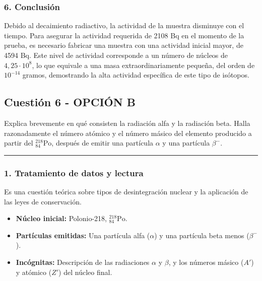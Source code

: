 \subsubsection*{6. Conclusión}
\begin{cajaconclusion}
Debido al decaimiento radiactivo, la actividad de la muestra disminuye con el tiempo. Para asegurar la actividad requerida de 2108 Bq en el momento de la prueba, es necesario fabricar una muestra con una actividad inicial mayor, de 4594 Bq. Este nivel de actividad corresponde a un número de núcleos de $4,25 \cdot 10^8$, lo que equivale a una masa extraordinariamente pequeña, del orden de $10^{-14}$ gramos, demostrando la alta actividad específica de este tipo de isótopos.
\end{cajaconclusion}

\newpage

\subsection{Cuestión 6 - OPCIÓN B}
\label{subsec:6B_2018_jun_ord}
\begin{cajaenunciado}
Explica brevemente en qué consisten la radiación alfa y la radiación beta. Halla razonadamente el número atómico y el número másico del elemento producido a partir del ${}_{84}^{218}\text{Po}$, después de emitir una partícula $\alpha$ y una partícula $\beta^{-}$.
\end{cajaenunciado}
\hrule

\subsubsection*{1. Tratamiento de datos y lectura}
Es una cuestión teórica sobre tipos de desintegración nuclear y la aplicación de las leyes de conservación.
\begin{itemize}
    \item \textbf{Núcleo inicial:} Polonio-218, ${}_{84}^{218}\text{Po}$.
    \item \textbf{Partículas emitidas:} Una partícula alfa ($\alpha$) y una partícula beta menos ($\beta^-$).
    \item \textbf{Incógnitas:} Descripción de las radiaciones $\alpha$ y $\beta$, y los números másico ($A'$) y atómico ($Z'$) del núcleo final.
\end{itemize}

